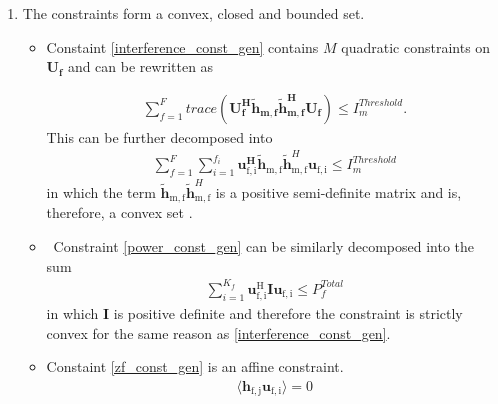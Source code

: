 \documentclass[12pt,a4paper]{report}
\begin{document}
\begin{enumerate}


\item
The constraints form a convex, closed and bounded set. 

\begin{itemize}

\item
	Constaint \eqref{interference_const_gen} contains $M$ quadratic constraints on $\mathbf{U_f}$ and 
	can be rewritten as 

\begin{gather*}
	\sum_{f=1}^F
	trace(\mathbf{U_f^H} \mathbf{\tilde{h}_{m,f}} \mathbf{\tilde{h}_{m,f}^H} \mathbf{U_f} )\leq 
	I^{Threshold}_{m}.
\end{gather*}
This can be further decomposed into  
	\begin{gather*}
	\sum_{f=1}^F
	\sum_{i=1}^{f_i}
	\mathbf{u_{\mathrm{f,i}}^H}\mathbf{\tilde{h}_{\mathrm{m,f}}} \mathbf{\tilde{h}}_{\mathrm{m,f}}^H
	\mathbf{u_{\mathrm{f,i}}} \leq I^{Threshold}_{m}
	\end{gather*}
in which the term $ \mathbf{\tilde{h}_{\mathrm{m,f}}} \mathbf{\tilde{h}}_{\mathrm{m,f}}^H$ is  a positive semi-definite matrix and is, therefore, a convex set 
\cite[p.8,9]{BoV:04}. 


\item \
	Constraint \eqref{power_const_gen} can be similarly decomposed into the sum
	\begin{gather*}
		\sum_{i=1}^{K_f}\mathbf{u_{\mathrm{f,i}}^{\mathrm{H}}} \mathbf{I} 		
		\mathbf{u_{\mathrm{f,i}}} \leq  P^{Total}_{f}
	\end{gather*}
	in which $\mathbf{I}$ is positive definite and 			
	therefore the constraint is strictly convex for the same 		
	reason as \eqref{interference_const_gen}.

\item 
	Constaint \eqref{zf_const_gen} is an affine constraint. 
		\begin{gather*}
		\langle \mathbf{h_{\mathrm{f,j}}}\mathbf{u_{\mathrm{f,i}}} \rangle =0
		\end{gather*}
\end{itemize}



\end{enumerate}
\end{document}

